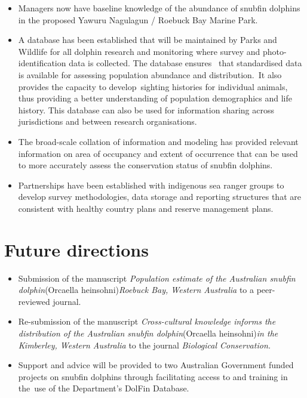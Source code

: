 \documentclass[version=last,
    paper=a4, %
    10pt, %
    usenames,
    dvipsnames,
    oneside, %
    headings=openany, %
    DIV=15 %
]{scrbook}
\begin{document}
\begin{itemize}
\itemsep1pt\parskip0pt
\item
  Managers now have baseline knowledge of the abundance of snubfin
  dolphins in the proposed Yawuru Nagulagun / Roebuck Bay Marine Park.~
\item
  A database has been established that will be maintained by Parks and
  Wildlife for all dolphin research and monitoring where survey and
  photo-identification data is collected. The database ensures~ that
  standardised data is available for assessing population abundance and
  distribution.~It also provides the capacity to develop~sighting
  histories for individual animals, thus providing a better
  understanding of population demographics and life history. This
  database can also be used for information sharing across jurisdictions
  and between research organisations.~
\item
  The broad-scale collation of information and modeling has provided
  relevant information on area of occupancy and extent of occurrence
  that can be used to more accurately assess the conservation status of
  snubfin dolphins.
\item
  Partnerships have been established with indigenous sea ranger groups
  to develop survey methodologies, data storage and reporting structures
  that are consistent with healthy country plans and reserve management
  plans.~
\end{itemize}



\section*{Future directions}
\begin{itemize}
\itemsep1pt\parskip0pt
\item
  Submission of the manuscript \emph{Population estimate of the
  Australian snubfin dolphin}(Orcaella heinsohni)\emph{Roebuck Bay,
  Western Australia} to a peer-reviewed journal.
\item
  Re-submission of the manuscript \emph{Cross-cultural knowledge informs
  the distribution of the Australian snubfin dolphin}(Orcaella
  heinsohni)\emph{in the Kimberley, Western Australia} to the journal
  \emph{Biological Conservation.}
\item
  Support and advice will be provided to two Australian Government
  funded projects on snubfin dolphins through facilitating access to and
  training in the~use of the Department's DolFin Database.~
\end{itemize}



\end{document}
